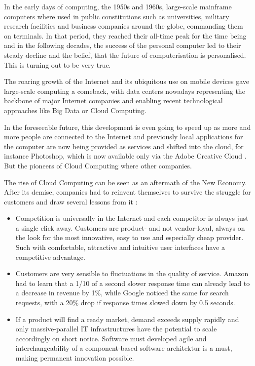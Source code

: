 In the early days of computing, the 1950s and 1960s, large-scale mainframe computers where used in public constitutions such as universities, military research facilities and business companies around the globe, commanding them on terminals. In that period, they reached their all-time peak for the time being and in the following decades, the success of the personal computer led to their steady decline and the belief, that the future of computerisation is personalised. This is turning out to be very true. 

The roaring growth of the Internet and its ubiquitous use on mobile devices gave large-scale computing a comeback, with data centers nowadays representing the backbone of major Internet companies and enabling recent technological approaches like Big Data or Cloud Computing.

In the foreseeable future, this development is even going to speed up as more and more people are connected to the Internet and previously local applications for the computer are now being provided as services and shifted into the cloud, for instance Photoshop, which is now available only via the Adobe Creative Cloud \cite{website:adobe-shift-cloud} \cite{website:adobe-photoshop-cc}. But the pioneers of Cloud Computing where other companies.

The rise of Cloud Computing can be seen as an aftermath of the New Economy. After its demise, companies had to reinvent themselves to survive the struggle for customers and draw several lessons from it \cite{bitkom2012soacloud}:

\begin{itemize}
	\itemsep2mm
	\item{Competition is universally in the Internet and each competitor is always just a single click away. Customers are product- and not vendor-loyal, always on the look for the most innovative, easy to use and especially cheap provider. Such with comfortable, attractive and intuitive user interfaces have a competitive advantage.}
	\item{Customers are very sensible to fluctuations in the quality of service. Amazon had to learn that a 1/10 of a second slower response time can already lead to a decrease in revenue by 1\%, while Google noticed the same for search requests, with a 20\% drop if response times slowed down by 0.5 seconds.}
	\item{If a product will find a ready market, demand exceeds supply rapidly and only massive-parallel IT infrastructures have the potential to scale accordingly on short notice. Software must developed agile and interchangeability of a component-based software architektur is a must, making permanent innovation possible.}
\end{itemize}

